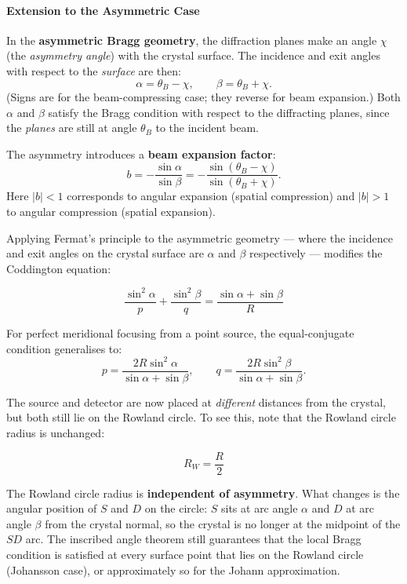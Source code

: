 \paragraph{Extension to the Asymmetric Case}
In the \textbf{asymmetric Bragg geometry}, the diffraction planes make an angle $\chi$
(the \emph{asymmetry angle}) with the crystal surface.  The incidence and exit angles with
respect to the \emph{surface} are then:
\begin{equation}
  \alpha = \theta_B - \chi, \qquad \beta = \theta_B + \chi.
  \label{eq:asym_angles}
\end{equation}
(Signs are for the beam-compressing case; they reverse for beam expansion.)  Both $\alpha$
and $\beta$ satisfy the Bragg condition with respect to the diffracting planes, since the
\emph{planes} are still at angle $\theta_B$ to the incident beam.

The asymmetry introduces a \textbf{beam expansion factor}:
\begin{equation}
  b = -\frac{\sin\alpha}{\sin\beta} = -\frac{\sin(\theta_B-\chi)}{\sin(\theta_B+\chi)}.
  \label{eq:asym_ratio}
\end{equation}
Here $|b|<1$ corresponds to angular expansion (spatial compression) and $|b|>1$ to angular
compression (spatial expansion).


Applying Fermat's principle to the asymmetric geometry --- where the incidence and exit
angles on the crystal surface are $\alpha$ and $\beta$ respectively --- modifies the
Coddington equation:

\begin{equation}
  \frac{\sin^2\alpha}{p} + \frac{\sin^2\beta}{q}
  = \frac{\sin\alpha + \sin\beta}{R}
  \label{eq:meridional_asym}
\end{equation}

For perfect meridional focusing from a point source, the equal-conjugate condition
generalises to:
\begin{equation}
  p = \frac{2R\sin^2\alpha}{\sin\alpha+\sin\beta},
  \qquad
  q = \frac{2R\sin^2\beta}{\sin\alpha+\sin\beta}.
  \label{eq:asym_conjugates}
\end{equation}

The source and detector are now placed at \emph{different} distances from the crystal, but
both still lie on the Rowland circle.  To see this, note that the Rowland circle radius is
unchanged:

\begin{equation}
  R_W = \frac{R}{2}
  \label{eq:rowland_asym}
\end{equation}

The Rowland circle radius is \textbf{independent of asymmetry}.  What changes is the
angular position of $S$ and $D$ on the circle: $S$ sits at arc angle $\alpha$ and $D$ at
arc angle $\beta$ from the crystal normal, so the crystal is no longer at the midpoint of
the $SD$ arc.  The inscribed angle theorem still guarantees that the local Bragg condition
is satisfied at every surface point that lies on the Rowland circle (Johansson case), or
approximately so for the Johann approximation.
